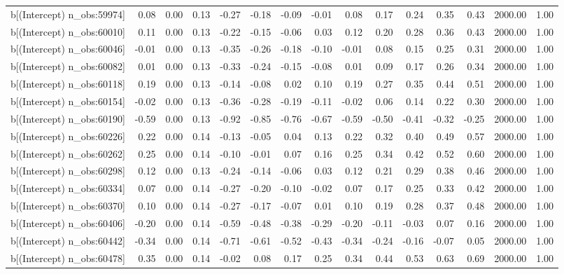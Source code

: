 \begin{table}[ht]
\begin{tabular}{rrrrrrrrrrrrrrr}
  b[(Intercept) n\_obs:59974] & 0.08 & 0.00 & 0.13 & -0.27 & -0.18 & -0.09 & -0.01 & 0.08 & 0.17 & 0.24 & 0.35 & 0.43 & 2000.00 & 1.00 \\ 
  b[(Intercept) n\_obs:60010] & 0.11 & 0.00 & 0.13 & -0.22 & -0.15 & -0.06 & 0.03 & 0.12 & 0.20 & 0.28 & 0.36 & 0.43 & 2000.00 & 1.00 \\ 
  b[(Intercept) n\_obs:60046] & -0.01 & 0.00 & 0.13 & -0.35 & -0.26 & -0.18 & -0.10 & -0.01 & 0.08 & 0.15 & 0.25 & 0.31 & 2000.00 & 1.00 \\ 
  b[(Intercept) n\_obs:60082] & 0.01 & 0.00 & 0.13 & -0.33 & -0.24 & -0.15 & -0.08 & 0.01 & 0.09 & 0.17 & 0.26 & 0.34 & 2000.00 & 1.00 \\ 
  b[(Intercept) n\_obs:60118] & 0.19 & 0.00 & 0.13 & -0.14 & -0.08 & 0.02 & 0.10 & 0.19 & 0.27 & 0.35 & 0.44 & 0.51 & 2000.00 & 1.00 \\ 
  b[(Intercept) n\_obs:60154] & -0.02 & 0.00 & 0.13 & -0.36 & -0.28 & -0.19 & -0.11 & -0.02 & 0.06 & 0.14 & 0.22 & 0.30 & 2000.00 & 1.00 \\ 
  b[(Intercept) n\_obs:60190] & -0.59 & 0.00 & 0.13 & -0.92 & -0.85 & -0.76 & -0.67 & -0.59 & -0.50 & -0.41 & -0.32 & -0.25 & 2000.00 & 1.00 \\ 
  b[(Intercept) n\_obs:60226] & 0.22 & 0.00 & 0.14 & -0.13 & -0.05 & 0.04 & 0.13 & 0.22 & 0.32 & 0.40 & 0.49 & 0.57 & 2000.00 & 1.00 \\ 
  b[(Intercept) n\_obs:60262] & 0.25 & 0.00 & 0.14 & -0.10 & -0.01 & 0.07 & 0.16 & 0.25 & 0.34 & 0.42 & 0.52 & 0.60 & 2000.00 & 1.00 \\ 
  b[(Intercept) n\_obs:60298] & 0.12 & 0.00 & 0.13 & -0.24 & -0.14 & -0.06 & 0.03 & 0.12 & 0.21 & 0.29 & 0.38 & 0.46 & 2000.00 & 1.00 \\ 
  b[(Intercept) n\_obs:60334] & 0.07 & 0.00 & 0.14 & -0.27 & -0.20 & -0.10 & -0.02 & 0.07 & 0.17 & 0.25 & 0.33 & 0.42 & 2000.00 & 1.00 \\ 
  b[(Intercept) n\_obs:60370] & 0.10 & 0.00 & 0.14 & -0.27 & -0.17 & -0.07 & 0.01 & 0.10 & 0.19 & 0.28 & 0.37 & 0.48 & 2000.00 & 1.00 \\ 
  b[(Intercept) n\_obs:60406] & -0.20 & 0.00 & 0.14 & -0.59 & -0.48 & -0.38 & -0.29 & -0.20 & -0.11 & -0.03 & 0.07 & 0.16 & 2000.00 & 1.00 \\ 
  b[(Intercept) n\_obs:60442] & -0.34 & 0.00 & 0.14 & -0.71 & -0.61 & -0.52 & -0.43 & -0.34 & -0.24 & -0.16 & -0.07 & 0.05 & 2000.00 & 1.00 \\ 
  b[(Intercept) n\_obs:60478] & 0.35 & 0.00 & 0.14 & -0.02 & 0.08 & 0.17 & 0.25 & 0.34 & 0.44 & 0.53 & 0.63 & 0.69 & 2000.00 & 1.00 \\ 

\end{tabular}
\end{table}
